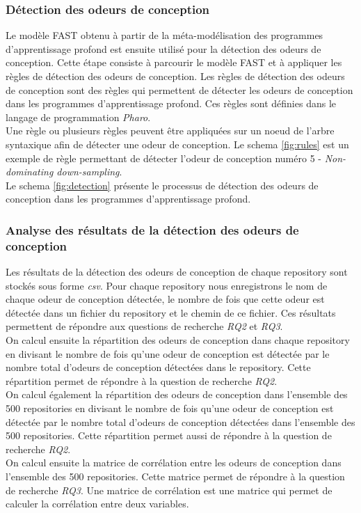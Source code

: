 \subsubsection{Détection des odeurs de conception}
\label{sec:Detection des odeurs de conception}
Le modèle FAST obtenu à partir de la méta-modélisation des programmes
d'apprentissage profond est ensuite utilisé pour la détection des odeurs de
conception. Cette étape consiste à parcourir le modèle FAST et à appliquer les
règles de détection des odeurs de conception. Les règles de détection des odeurs
de conception sont des règles qui permettent de détecter les odeurs de
conception dans les programmes d'apprentissage profond. Ces règles sont définies
dans le langage de programmation \emph{Pharo}.\\ Une règle ou plusieurs règles
peuvent être appliquées sur un noeud de l'arbre syntaxique afin de détecter une
odeur de conception. Le schema \ref{fig:rules} est un exemple de règle
permettant de détecter l'odeur de conception numéro 5 - \emph{Non-dominating down-sampling}.\\
Le schema \ref{fig:detection} présente le processus de détection des odeurs de conception dans les programmes d'apprentissage profond.\\


\subsubsection{Analyse des résultats de la détection des odeurs de conception}
\label{sec:Analyse des résultats de la détection des odeurs de conception}
Les résultats de la détection des odeurs de conception de chaque repository sont
stockés sous forme \emph{csv}. Pour chaque repository nous enregistrons le nom de
chaque odeur de conception détectée, le nombre de fois que cette odeur est
détectée dans un fichier du repository et le chemin de ce fichier. Ces résultats
permettent de répondre aux questions de recherche \emph{RQ2} et \emph{RQ3}.\\
On calcul ensuite la répartition des odeurs de conception dans chaque repository
en divisant le nombre de fois qu'une odeur de conception est détectée par le
nombre total d'odeurs de conception détectées dans le repository. Cette
répartition permet de répondre à la question de recherche \emph{RQ2}.\\ On
calcul également la répartition des odeurs de conception dans l'ensemble des 500
repositories en divisant le nombre de fois qu'une odeur de conception est
détectée par le nombre total d'odeurs de conception détectées dans l'ensemble
des 500 repositories. Cette répartition permet aussi de répondre à la
question de recherche \emph{RQ2}.\\
On calcul ensuite la matrice de corrélation entre les odeurs de conception dans
l'ensemble des 500 repositories. Cette matrice permet de répondre à la question
de recherche \emph{RQ3}. Une matrice de corrélation est une matrice qui permet
de calculer la corrélation entre deux variables.

